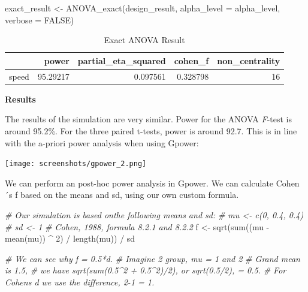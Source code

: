 \documentclass[
]{book}
\newenvironment{Shaded}{\begin{snugshade}}{\end{snugshade}}
\newcommand{\AttributeTok}[1]{\textcolor[rgb]{0.77,0.63,0.00}{#1}}
\newcommand{\CommentTok}[1]{\textcolor[rgb]{0.56,0.35,0.01}{\textit{#1}}}
\newcommand{\ConstantTok}[1]{\textcolor[rgb]{0.00,0.00,0.00}{#1}}
\newcommand{\DecValTok}[1]{\textcolor[rgb]{0.00,0.00,0.81}{#1}}
\newcommand{\FunctionTok}[1]{\textcolor[rgb]{0.00,0.00,0.00}{#1}}
\newcommand{\NormalTok}[1]{#1}
\newcommand{\OtherTok}[1]{\textcolor[rgb]{0.56,0.35,0.01}{#1}}
\newcommand{\SpecialCharTok}[1]{\textcolor[rgb]{0.00,0.00,0.00}{#1}}
\begin{document}
\begin{Shaded}
\begin{Highlighting}[]
\NormalTok{exact\_result }\OtherTok{\textless{}{-}} \FunctionTok{ANOVA\_exact}\NormalTok{(design\_result,}
                            \AttributeTok{alpha\_level =}\NormalTok{ alpha\_level,}
                            \AttributeTok{verbose =} \ConstantTok{FALSE}\NormalTok{)}
\end{Highlighting}
\end{Shaded}

\begin{table}[!h]

\caption{\label{tab:unnamed-chunk-387}Exact ANOVA Result}
\centering
\begin{tabular}[t]{l|r|r|r|r}
\hline
  & power & partial\_eta\_squared & cohen\_f & non\_centrality\\
\hline
speed & 95.29217 & 0.097561 & 0.328798 & 16\\
\hline
\end{tabular}
\end{table}

\textbf{Results}

The results of the simulation are very similar. Power for the ANOVA \emph{F}-test is around 95.2\%. For the three paired t-tests, power is around 92.7. This is in line with the a-priori power analysis when using Gpower:

\texttt{[image: screenshots/gpower\_2.png]}

We can perform an post-hoc power analysis in Gpower. We can calculate Cohen´s f based on the means and sd, using our own custom formula.

\begin{Shaded}
\begin{Highlighting}[]
\CommentTok{\# Our simulation is based onthe following means and sd:}
\CommentTok{\# mu \textless{}{-} c(0, 0.4, 0.4)}
\CommentTok{\# sd \textless{}{-} 1}
\CommentTok{\# Cohen, 1988, formula 8.2.1 and 8.2.2}
\NormalTok{f }\OtherTok{\textless{}{-}} \FunctionTok{sqrt}\NormalTok{(}\FunctionTok{sum}\NormalTok{((mu }\SpecialCharTok{{-}} \FunctionTok{mean}\NormalTok{(mu)) }\SpecialCharTok{\^{}} \DecValTok{2}\NormalTok{) }\SpecialCharTok{/} \FunctionTok{length}\NormalTok{(mu)) }\SpecialCharTok{/}\NormalTok{ sd }

\CommentTok{\# We can see why f = 0.5*d.}
\CommentTok{\# Imagine 2 group, mu = 1 and 2}
\CommentTok{\# Grand mean is 1.5, }
\CommentTok{\# we have sqrt(sum(0.5\^{}2 + 0.5\^{}2)/2), or sqrt(0.5/2), = 0.5.}
\CommentTok{\# For Cohen\textquotesingle{}s d we use the difference, 2{-}1 = 1. }
\end{Highlighting}
\end{Shaded}
\end{document}
